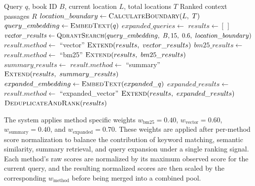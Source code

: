 \begin{algorithm}[!t]
\caption{Multi-Modal Retrieval with Progress Filtering}
\label{alg:multi-modal-retrieval}
\begin{algorithmic}[1]
\Require Query $q$, book ID $B$, current location $L$, total locations $T$
\Ensure Ranked context passages $R$
\State $location\_boundary \gets \Call{CalculateBoundary}{L,\ T}$
\State $query\_embedding \gets \Call{EmbedText}{q}$
\State $expanded\_queries \gets$
\Statex \hspace{\algorithmicindent}
\State $results \gets [\,]$
\Statex
{}
\State $vector\_results \gets \Call{QdrantSearch}{query\_embedding,\ B,\allowbreak 15,\ 0.6,\ location\_boundary}$
    \State $result.method \gets$ ``vector''
\EndFor
\State $\Call{Extend}{results,\ vector\_results}$
\Statex
{}
\State $bm25\_results \gets$
\Statex \hspace{\algorithmicindent}
    \State $result.method \gets$ ``bm25''
\EndFor
\State $\Call{Extend}{results,\ bm25\_results}$
\Statex
{}
\State $summary\_results \gets$
\Statex \hspace{\algorithmicindent}
    \State $result.method \gets$ ``summary''
\EndFor
\State $\Call{Extend}{results,\ summary\_results}$
\Statex
{}
    \State $expanded\_embedding \gets \Call{EmbedText}{expanded\_q}$
    \State $expanded\_results \gets$
    \Statex \hspace{\algorithmicindent}
        \State $result.method \gets$ ``expanded\_vector''
    \EndFor
    \State $\Call{Extend}{results,\ expanded\_results}$
\EndFor
\State \Return $\Call{DeduplicateAndRank}{results}$
\end{algorithmic}
\end{algorithm}

The system applies method specific weights \(w_{\text{bm25}} = 0.40\),
\(w_{\text{vector}} = 0.60\),
\(w_{\text{summary}} = 0.40\),
and \(w_{\text{expanded}} = 0.70\).
These weights are applied after per-method score normalization to balance the contribution of keyword matching, semantic similarity, summary retrieval, and query expansion under a single ranking signal.
Each method’s raw scores are normalized by its maximum observed score for the current query, and the resulting normalized scores are then scaled by the corresponding \(w_{\text{method}}\) before being merged into a combined pool.

